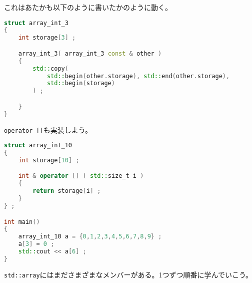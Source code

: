 これはあたかも以下のように書いたかのように動く。

\begin{lstlisting}[language={C++}]
struct array_int_3
{
    int storage[3] ;

    array_int_3( array_int_3 const & other )
    {
        std::copy(
            std::begin(other.storage), std::end(other.storage),
            std::begin(storage)
        ) ;

    }
}
\end{lstlisting}

\texttt{operator []}も実装しよう。

\begin{lstlisting}[language={C++}]
struct array_int_10
{
    int storage[10] ;

    int & operator [] ( std::size_t i )
    {
        return storage[i] ;
    }
} ;

int main()
{
    array_int_10 a = {0,1,2,3,4,5,6,7,8,9} ;
    a[3] = 0 ;
    std::cout << a[6] ;
}
\end{lstlisting}

\texttt{std::array}にはまださまざまなメンバーがある。1つずつ順番に学んでいこう。

